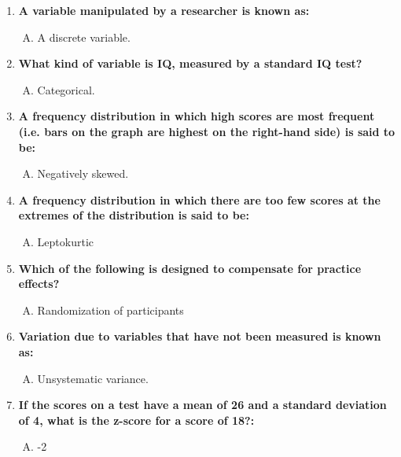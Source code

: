 \documentclass{article}[14pt]
\begin{document}
\begin{enumerate}[1.]
 \item %
  {\bf A variable manipulated by a researcher is known as:}
 \begin{enumerate}[C.]
 \item 
  A discrete variable.
\end{enumerate}
 \item %
  {\bf  What kind of variable is IQ, measured by a standard IQ test?}
 \begin{enumerate}[A.]
 \item 
  Categorical.
\end{enumerate}
 \item %
  {\bf  A frequency distribution in which high scores are most frequent (i.e. bars on the graph are highest on the right-hand side) is said to be:}
 \begin{enumerate}[D.]
 \item 
   Negatively skewed.
\end{enumerate}

 \item %
   {\bf A frequency distribution in which there are too few scores at the extremes of the distribution is said to be:  }
 \begin{enumerate}[B.]
 \item 
   Leptokurtic
\end{enumerate}
 \item %
    {\bf  Which of the following is designed to compensate for practice effects?}
 \begin{enumerate}[B.]
 \item 
   Randomization of participants
\end{enumerate}
 \item %
  {\bf  Variation due to variables that have not been measured is known as:}
 \begin{enumerate}[A.]
 \item 
   Unsystematic variance.
\end{enumerate}
 
 \item %
   {\bf  If the scores on a test have a mean of 26 and a standard deviation of 4, what is the z-score for a score of 18?:}
 \begin{enumerate}[A.]
 \item 
   -2
\end{enumerate}
\end{enumerate}
\end{document}
